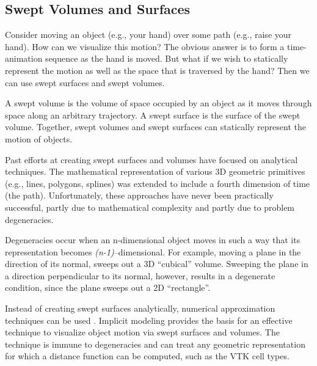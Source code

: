 \clearpage

\subsection{Swept Volumes and Surfaces}

Consider moving an object (e.g., your hand) over some path (e.g., raise your hand). How can we visualize this motion? The obvious answer is to form a time-animation sequence as the hand is moved. But what if we wish to statically represent the motion as well as the space that is traversed by the hand? Then we can use swept surfaces and swept volumes.

A swept volume is the volume of space occupied by an object as it moves through space along an arbitrary trajectory. A swept surface is the surface of the swept volume. Together, swept volumes and swept surfaces can statically represent the motion of objects.

Past efforts at creating swept surfaces and volumes have focused on analytical techniques. The mathematical representation of various 3D geometric primitives (e.g., lines, polygons, splines) was extended to include a fourth dimension of time (the path). Unfortunately, these approaches have never been practically successful, partly due to mathematical complexity and partly due to problem degeneracies.

Degeneracies occur when an n-dimensional object moves in such a way that its representation becomes \emph{(n-1)}--dimensional. For example, moving a plane in the direction of its normal, sweeps out a 3D ``cubical'' volume. Sweeping the plane in a direction perpendicular to its normal, however, results in a degenerate condition, since the plane sweeps out a 2D ``rectangle''.

Instead of creating swept surfaces analytically, numerical approximation techniques can be used \cite{Schroeder94}. Implicit modeling provides the basis for an effective technique to visualize object motion via swept surfaces and volumes. The technique is immune to degeneracies and can treat any geometric representation for which a distance function can be computed, such as the VTK cell types.

